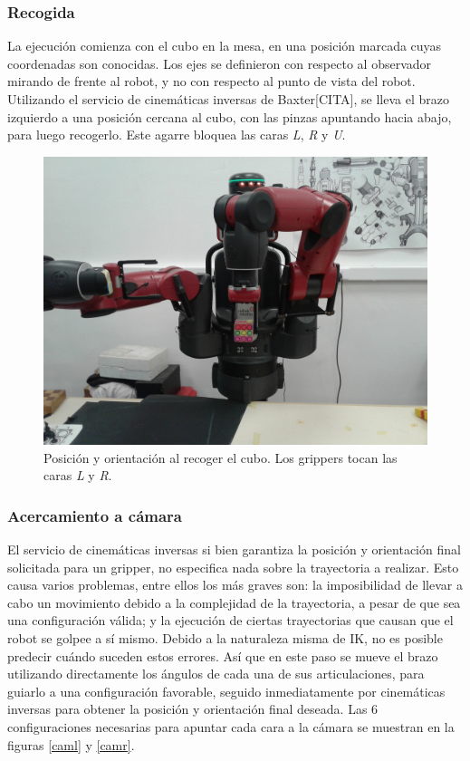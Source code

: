 \subsubsection{Recogida}
La ejecución comienza con el cubo en la mesa, en una posición marcada cuyas coordenadas son conocidas. Los ejes se definieron con respecto al observador mirando de frente al robot, y no con respecto al punto de vista del robot. Utilizando el servicio de cinemáticas inversas de Baxter[CITA], se lleva el brazo izquierdo a una posición cercana al cubo, con las pinzas apuntando hacia abajo, para luego recogerlo. Este agarre bloquea las caras \textit{L}, \textit{R} y \textit{U}.

\begin{figure}[h!]
	\centering
	\includegraphics[scale=0.1]{figures/pick}
	\caption[Posición y orientación al recoger el cubo.]{Posición y orientación al recoger el cubo. Los grippers tocan las caras \textit{L} y \textit{R}.}
	\label{pick}
\end{figure}

\subsubsection{Acercamiento a cámara}
El servicio de cinemáticas inversas si bien garantiza la posición y orientación final solicitada para un gripper, no especifica nada sobre la trayectoria a realizar. Esto causa varios problemas, entre ellos los más graves son: la imposibilidad de llevar a cabo un movimiento debido a la complejidad de la trayectoria, a pesar de que sea una configuración válida; y la ejecución de ciertas trayectorias que causan que el robot se golpee a sí mismo. Debido a la naturaleza misma de IK, no es posible predecir cuándo suceden estos errores. Así que en este paso se mueve el brazo utilizando directamente los ángulos de cada una de sus articulaciones, para guiarlo a una configuración favorable, seguido inmediatamente por cinemáticas inversas para obtener la posición y orientación final deseada. Las $6$ configuraciones necesarias para apuntar cada cara a la cámara se muestran en la figuras \ref{caml} y \ref{camr}.

